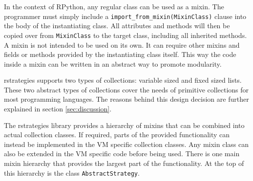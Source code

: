 In the context of RPython, any regular class can be used as a mixin.
The programmer must simply include a \lstinline{import_from_mixin(MixinClass)} clause into the body of the instantiating class.
All attributes and methods will then be copied over from \lstinline{MixinClass} to the target class, including all inherited methods.
A mixin is not intended to be used on its own.
It can require other mixins and fields or methods provided by the instantiating class itself.
This way the code inside a mixin can be written in an abstract way to promote modularity.

rstrategies supports two types of collections: variable sized and fixed sized lists.
These two abstract types of collections cover the needs of primitive collections for most programming languages.
The reasons behind this design decision are further explained in section \ref{sec:discussion}.

The rstrategies library provides a hierarchy of mixins that can be combined into actual collection classes.
If required, parts of the provided functionality can instead be implemented in the VM specific collection classes.
Any mixin class can also be extended in the VM specific code before being used.
There is one main mixin hierarchy that provides the largest part of the functionality.
At the top of this hierarchy is the class \lstinline{AbstractStrategy}.

